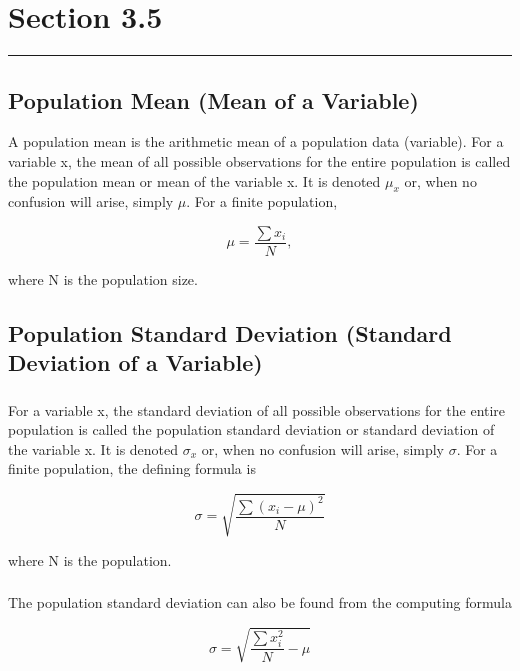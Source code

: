 \documentclass[12pt]{article}
\begin{document}
    \section*{Section 3.5}
    \noindent\rule{\textwidth}{0.4pt}
        \subsection*{Population Mean (Mean of a Variable)}
            A population mean is the arithmetic mean of a population data (variable). For a variable x,
            the mean of all possible observations for the entire population is called the population 
            mean or mean of the variable x. It is denoted \(\mu_x\) or, when no confusion will arise,
            simply \(\mu\). For a finite population,
            \begin{center}
                \[
                    \mu = \frac{\sum{x_i}}{N},    
                \]    
            \end{center}
            where N is the population size.
        \subsection*{Population Standard Deviation (Standard Deviation of a Variable)}
            \subsubsection*{}    
                For a variable x, the standard deviation of all possible observations for the entire
                population is called the population standard deviation or standard deviation of the 
                variable x. It is denoted \(\sigma_x\) or, when no confusion will arise, simply \(\sigma\). 
                For a finite population, the defining formula is
                \begin{center}
                    \[
                        \sigma = \sqrt{\frac{\sum(x_i-\mu)^2}{N}}
                    \]                
            \end{center}
                where N is the population.
            \subsubsection*{}
                The population standard deviation can also be found from the computing formula 
                \begin{center}
                    \[
                        \sigma = \sqrt{\frac{\sum x_i^2}{N}-\mu}
                    \]                    
                \end{center}
\end{document}
